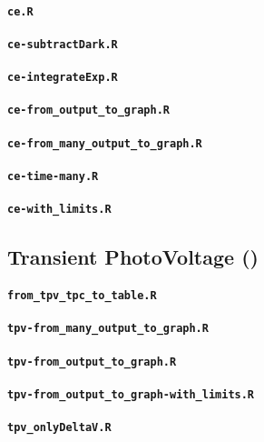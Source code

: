 		\paragraph{\texttt{ce.R}}
		\paragraph{\texttt{ce-subtractDark.R}}
		\paragraph{\texttt{ce-integrateExp.R}}
		\paragraph{\texttt{ce-from_output_to_graph.R}}
		\paragraph{\texttt{ce-from_many_output_to_graph.R}}
		\paragraph{\texttt{ce-time-many.R}}
		\paragraph{\texttt{ce-with_limits.R}}

	\subsection{Transient PhotoVoltage ()}\label{r_tpv}

		\paragraph{\texttt{from_tpv_tpc_to_table.R}}
		\paragraph{\texttt{tpv-from_many_output_to_graph.R}}
		\paragraph{\texttt{tpv-from_output_to_graph.R}}
		\paragraph{\texttt{tpv-from_output_to_graph-with_limits.R}}
		\paragraph{\texttt{tpv_onlyDeltaV.R}}
